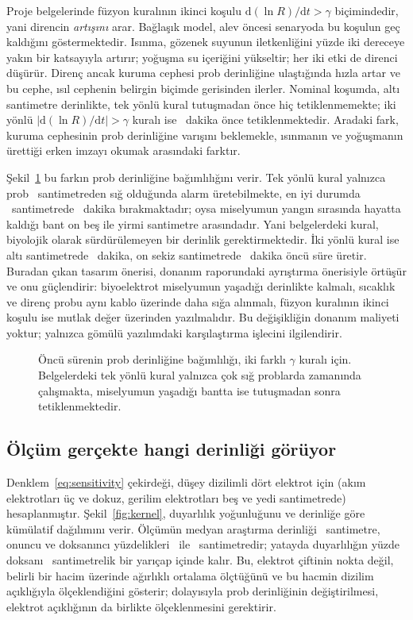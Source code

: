 \documentclass[11pt,a4paper]{article}
\newcommand{\dd}{\mathrm{d}}
\begin{document}
Proje belgelerinde füzyon kuralının ikinci koşulu
$\dd(\ln R)/\dd t > \gamma$ biçimindedir, yani direncin \emph{artışını} arar.
Bağlaşık model, alev öncesi senaryoda bu koşulun geç kaldığını göstermektedir.
Isınma, gözenek suyunun iletkenliğini yüzde iki dereceye yakın bir katsayıyla
artırır; yoğuşma su içeriğini yükseltir; her iki etki de direnci düşürür.
Direnç ancak kuruma cephesi prob derinliğine ulaştığında hızla artar ve bu
cephe, ısıl cephenin belirgin biçimde gerisinden ilerler.
Nominal koşumda, altı santimetre derinlikte, tek yönlü kural tutuşmadan önce
hiç tetiklenmemekte; iki yönlü $|\dd(\ln R)/\dd t| > \gamma$ kuralı ise
\leadNom~dakika önce tetiklenmektedir. Aradaki fark, kuruma cephesinin prob
derinliğine varışını beklemekle, ısınmanın ve yoğuşmanın ürettiği erken imzayı
okumak arasındaki farktır.

Şekil~\ref{fig:depth} bu farkın prob derinliğine bağımlılığını verir. Tek yönlü
kural yalnızca prob \zOneMax~santimetreden sığ olduğunda alarm üretebilmekte,
en iyi durumda \zOneBest~santimetrede \leadOneBest~dakika bırakmaktadır; oysa
miselyumun yangın sırasında hayatta kaldığı bant on beş ile yirmi santimetre
arasındadır. Yani belgelerdeki kural, biyolojik olarak sürdürülemeyen bir
derinlik gerektirmektedir. İki yönlü kural ise altı santimetrede
\leadSix~dakika, on sekiz santimetrede \leadEighteen~dakika öncü süre üretir. Buradan çıkan tasarım önerisi, donanım raporundaki ayrıştırma
önerisiyle örtüşür ve onu güçlendirir: biyoelektrot miselyumun yaşadığı
derinlikte kalmalı, sıcaklık ve direnç probu aynı kablo üzerinde daha sığa
alınmalı, füzyon kuralının ikinci koşulu ise mutlak değer üzerinden
yazılmalıdır. Bu değişikliğin donanım maliyeti yoktur; yalnızca gömülü
yazılımdaki karşılaştırma işlecini ilgilendirir.

\begin{figure}[htbp]\centering

\caption{Öncü sürenin prob derinliğine bağımlılığı, iki farklı $\gamma$ kuralı
için. Belgelerdeki tek yönlü kural yalnızca çok sığ problarda zamanında
çalışmakta, miselyumun yaşadığı bantta ise tutuşmadan sonra tetiklenmektedir.}
\label{fig:depth}
\end{figure}

\subsection{Ölçüm gerçekte hangi derinliği görüyor}
\label{sec:kernel}

Denklem~\eqref{eq:sensitivity} çekirdeği, düşey dizilimli dört elektrot için
(akım elektrotları üç ve dokuz, gerilim elektrotları beş ve yedi santimetrede)
hesaplanmıştır. Şekil~\ref{fig:kernel}, duyarlılık yoğunluğunu ve derinliğe
göre kümülatif dağılımını verir. Ölçümün medyan araştırma derinliği
\zMedian~santimetre, onuncu ve doksanıncı yüzdelikleri \zPten\ ile
\zPninety~santimetredir; yatayda duyarlılığın yüzde doksanı
\rPninety~santimetrelik bir yarıçap içinde kalır. Bu, elektrot çiftinin nokta
değil, belirli bir hacim üzerinde ağırlıklı ortalama ölçtüğünü ve bu hacmin
dizilim açıklığıyla ölçeklendiğini gösterir; dolayısıyla prob derinliğinin
değiştirilmesi, elektrot açıklığının da birlikte ölçeklenmesini gerektirir.
\end{document}

